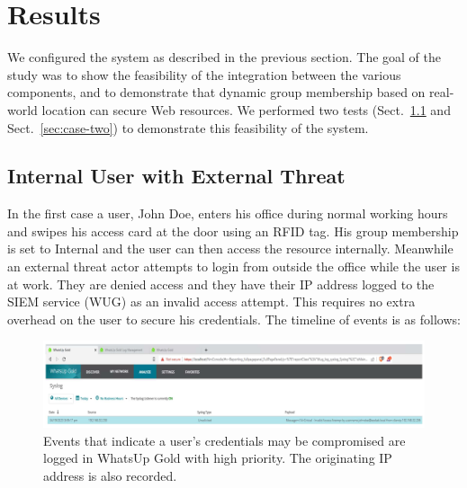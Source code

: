 \section{Results}\label{sec:results}

We configured the system as described in the previous section.  The
goal of the study was to show the feasibility of the integration
between the various components, and to demonstrate that dynamic group
membership based on real-world location can secure Web resources.  We
performed two tests (Sect.~\ref{sec:case-one} and
Sect.~\ref{sec:case-two}) to demonstrate this feasibility of the
system.

\subsection{Internal User with External Threat}\label{sec:case-one}

In the first case a user, John Doe, enters his office during normal
working hours and swipes his access card at the door using an RFID
tag.  His group membership is set to Internal and the user can then
access the resource internally.  Meanwhile an external threat actor
attempts to login from outside the office while the user is at work.
They are denied access and they have their IP address logged to the
SIEM service (WUG) as an invalid access attempt.  This requires no
extra overhead on the user to secure his credentials.  The timeline of
events is as follows:

\begin{figure}
  \centerline{\includegraphics[width=\textwidth]{img/whatsup-gold-alert}}
  \caption{Events that indicate a user's credentials may be
    compromised are logged in WhatsUp Gold with high priority.  The
    originating IP address is also
    recorded.}\label{fig:whatsup-gold-alert}
\end{figure}

